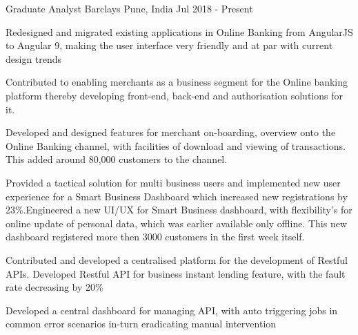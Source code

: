 

\begin{cventries}


  \cventry
    {Graduate Analyst} %
    {Barclays} %
    {Pune, India} %
    {Jul 2018 - Present} %
    {
      \begin{cvitems} %
      \item {Redesigned and migrated existing applications in Online Banking from AngularJS to Angular 9, making the user interface very friendly and at par with current design trends}
         \item {Contributed to enabling merchants as a business segment for the Online banking platform thereby developing front-end, back-end and authorisation solutions for it.
         \item Developed and designed features for merchant on-boarding, overview onto the Online Banking channel, with facilities of download and viewing of transactions. This added around 80,000 customers to the channel.}
        \item {Provided a tactical solution for multi business users and implemented new user experience for a Smart Business Dashboard which increased new registrations by 23\%.Engineered a new UI/UX for Smart Business dashboard, with flexibility's for online update of personal data, which was earlier available only offline.  This new dashboard registered more then 3000 customers in the first week itself.}
        \item {Contributed and  developed a centralised platform for the development of Restful APIs. Developed Restful API for business instant lending feature, with the fault rate decreasing by 20\%}
         \item { Developed a central dashboard for managing API,  with auto triggering jobs in common error scenarios in-turn eradicating manual intervention}
      \end{cvitems}
    }


\end{cventries}
